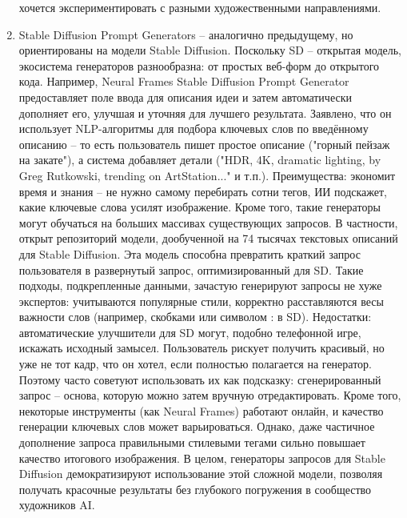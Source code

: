 \begin{enumerate}[label=\arabic*]
хочется экспериментировать с разными художественными направлениями.

\item Stable Diffusion Prompt Generators – аналогично предыдущему, но ориентированы на модели Stable Diffusion. Поскольку SD – открытая модель, экосистема генераторов разнообразна: от простых веб-форм до открытого кода. Например, Neural Frames Stable Diffusion Prompt Generator предоставляет поле ввода для описания идеи и затем автоматически дополняет его, улучшая и уточняя для лучшего результата\cite{neuralframes:sdprompt}.  Заявлено, что он использует NLP-алгоритмы для подбора ключевых слов по введённому описанию  – то есть пользователь пишет простое описание ("горный пейзаж на закате"), а система добавляет детали ("HDR, 4K, dramatic lighting, by Greg Rutkowski, trending on ArtStation..." и т.п.)\cite{feedough:sdprompt}. Преимущества: экономит время и знания – не нужно самому перебирать сотни тегов, ИИ подскажет, какие ключевые слова усилят изображение. Кроме того, такие генераторы могут обучаться на больших массивах существующих запросов. В частности, открыт репозиторий модели, дообученной на 74 тысячах текстовых описаний для Stable Diffusion\cite{ollama:sdprompt}. Эта модель способна превратить краткий запрос пользователя в развернутый запрос, оптимизированный для SD\cite{ollama:sdprompt}. Такие подходы, подкрепленные данными, зачастую генерируют запросы не хуже экспертов: учитываются популярные стили, корректно расставляются весы важности слов (например, скобками или символом : в SD). Недостатки: автоматические улучшители для SD могут, подобно телефонной игре, искажать исходный замысел. Пользователь рискует получить красивый, но уже не тот кадр, что он хотел, если полностью полагается на генератор. Поэтому часто советуют использовать их как подсказку: сгенерированный запрос – основа, которую можно затем вручную отредактировать. Кроме того, некоторые инструменты (как Neural Frames) работают онлайн, и качество генерации ключевых слов может варьироваться. Однако, даже частичное дополнение запроса правильными стилевыми тегами сильно повышает качество итогового изображения\cite{feedough:sdprompt}. В целом, генераторы запросов для Stable Diffusion демократизируют использование этой сложной модели, позволяя получать красочные результаты без глубокого погружения в сообщество художников AI.


\end{enumerate}
